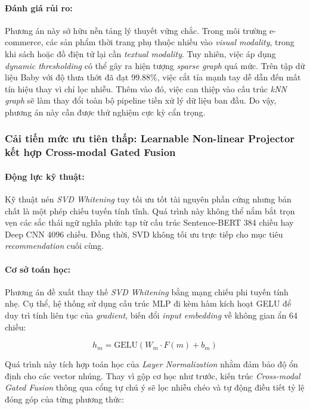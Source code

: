 \begin{longtable}
\paragraph{Đánh giá rủi ro:}
Phương án này sở hữu nền tảng lý thuyết vững chắc. Trong môi trường e-commerce, các sản phẩm thời trang phụ thuộc nhiều vào \textit{visual modality}, trong khi sách hoặc đồ điện tử lại cần \textit{textual modality}. Tuy nhiên, việc áp dụng \textit{dynamic thresholding} có thể gây ra hiện tượng \textit{sparse graph} quá mức. Trên tập dữ liệu Baby với độ thưa thớt đã đạt 99.88\%, việc cắt tỉa mạnh tay dễ dẫn đến mất tín hiệu thay vì chỉ lọc nhiễu. Thêm vào đó, việc can thiệp vào cấu trúc \textit{kNN graph} sẽ làm thay đổi toàn bộ pipeline tiền xử lý dữ liệu ban đầu. Do vậy, phương án này cần được thử nghiệm cực kỳ cẩn trọng.

\subsubsection{Cải tiến mức ưu tiên thấp: Learnable Non-linear Projector kết hợp Cross-modal Gated Fusion}

\paragraph{Động lực kỹ thuật:}
Kỹ thuật nén \textit{SVD Whitening} tuy tối ưu tốt tài nguyên phần cứng nhưng bản chất là một phép chiếu tuyến tính tĩnh. Quá trình này không thể nắm bắt trọn vẹn các sắc thái ngữ nghĩa phức tạp từ cấu trúc Sentence-BERT 384 chiều hay Deep CNN 4096 chiều. Đồng thời, SVD không tối ưu trực tiếp cho mục tiêu \textit{recommendation} cuối cùng.

\paragraph{Cơ sở toán học:}
Phương án đề xuất thay thế \textit{SVD Whitening} bằng mạng chiếu phi tuyến tính nhẹ. Cụ thể, hệ thống sử dụng cấu trúc MLP đi kèm hàm kích hoạt GELU để duy trì tính liên tục của \textit{gradient}, biến đổi \textit{input embedding} về không gian ẩn 64 chiều:

\begin{equation}
h_m = \text{GELU}(W_m \cdot F(m) + b_m)
\end{equation}

Quá trình này tích hợp toán học của \textit{Layer Normalization} nhằm đảm bảo độ ổn định cho các vector nhúng. Thay vì gộp cơ học như trước, kiến trúc \textit{Cross-modal Gated Fusion} thông qua cổng tự chú ý sẽ lọc nhiễu chéo và tự động điều tiết tỷ lệ đóng góp của từng phương thức:


\end{longtable}
